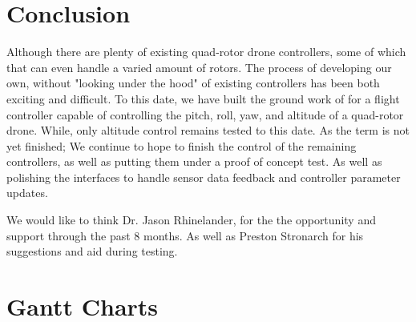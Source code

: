 \documentclass[12pt,letterpaper,titlepage]{article}
\begin{document}
	\section{Conclusion}
	Although there are plenty of existing quad-rotor drone controllers, some of which that can even handle a varied amount of rotors.  The process of developing our own, without "looking under the hood" of existing controllers has been both exciting and difficult.  To this date, we have built the ground work of for a flight controller capable of controlling the pitch, roll, yaw, and altitude of a quad-rotor drone.  While, only altitude control remains tested to this date.  As the term is not yet finished; We continue to hope to finish the control of the remaining controllers, as well as putting them under a proof of concept test.  As well as polishing the interfaces to handle sensor data feedback and controller parameter updates.  
	
	We would like to think Dr. Jason Rhinelander, for the the opportunity and support through the past 8 months.  As well as Preston Stronarch for his suggestions and aid during testing.
	

	\pagebreak
	
	\newpage

	\appendix
	
	
	\label{appendix:simulation}
	
	
	\label{appendix:software}
	
	
	\label{appendix:gui}

	\section{Gantt Charts}
	\begin{landscape}
		
	\end{landscape}
	
\end{document}
